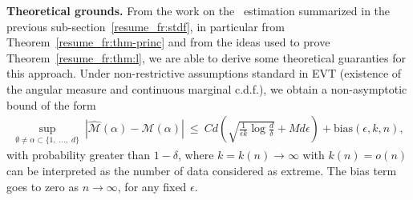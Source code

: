 \textbf{Theoretical grounds.}
From the work on the \stdf~estimation summarized in the previous sub-section~\ref{resume_fr:stdf}, in particular from Theorem~\ref{resume_fr:thm-princ} and from the ideas used to prove Theorem~\ref{resume_fr:thm:l}, we are able to derive some theoretical guaranties for this approach.
%
Under non-restrictive assumptions standard in EVT (existence of the angular measure and continuous marginal c.d.f.), we obtain a non-asymptotic bound of the form
\begin{align*}
\sup_{\emptyset \neq \alpha \subset \{1,\; \ldots,\; d \}}~ |\widehat{\mathcal{M}}(\alpha)- \mathcal{M}(\alpha)|
~\le~  C d \left( \sqrt{ \frac{1}{\epsilon k}\log\frac{d}{\delta}} + M d\epsilon \right) + \text{bias}(\epsilon, k, n),
\end{align*}
with probability greater than $1-\delta$, where $k = k(n) \to \infty$ with $k(n) = o(n)$ can be interpreted as the number of data considered as extreme. 
The bias term goes to zero as $n \to \infty$, for any fixed $\epsilon$.




